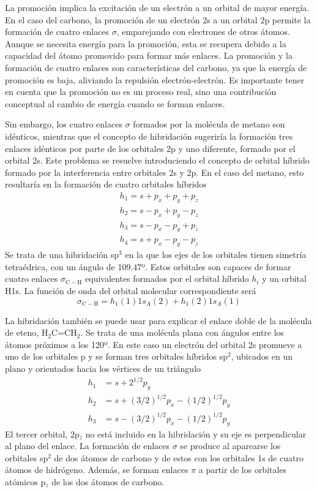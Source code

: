 \documentclass{tufte-handout}
\begin{document}
La promoción implica la excitación de
un electrón a un orbital de mayor energía. En el caso del carbono, 
la promoción de un electrón 2s a un orbital 
2p permite la formación de cuatro enlaces $\sigma$, emparejando con
electrones de otros átomos. Aunque se necesita energía para la
promoción, esta se recupera debido a la capacidad del átomo 
promovido para formar más enlaces. La promoción y la formación de cuatro enlaces son características del carbono, ya que la energía 
de promoción es baja, aliviando la repulsión electrón-electrón. 
Es importante tener en cuenta que la promoción no es un proceso 
real, sino una contribución conceptual al cambio de energía cuando 
se forman enlaces.

Sin embargo, los cuatro enlaces $\sigma$ formados por la molécula
de metano son idénticos, mientras que el concepto de hibridación
sugeriría la formación tres enlaces idénticos por parte de los 
orbitales 2p y uno diferente, formado por el orbital 2s. Este
problema se resuelve introduciendo el concepto de orbital híbrido
formado por la interferencia entre orbitales 2s y 2p.
En el caso del metano, esto resultaría en la formación de cuatro 
orbitales 
híbridos
\begin{align*}
    h_1=s+p_x+p_y+p_z\\
    h_2=s-p_x+p_y-p_z\\
    h_3=s-p_x-p_y+p_z\\
    h_4=s+p_x-p_y-p_z
\end{align*}
Se trata de una hibridación sp$^3$ en la que los ejes 
de los orbitales tienen simetría tetraédrica, con
un ángulo de 109.47º. Estos orbitales son capaces de
formar cuatro enlaces $\sigma_\mathrm{C-H}$ equivalentes
formados por el orbital híbrido $h_i$ y un orbital 
H1s. La función de onda del orbital molecular correspondiente
será 
\begin{equation*}
	\sigma_\mathrm{C-H}=h_1(1)1s_{A}(2)+h_1(2)1s_{A}(1)
\end{equation*}

La hibridación también se puede usar para explicar el enlace
doble de la molécula de eteno, H$_2$C=CH$_2$. Se trata de 
una molécula plana con ángulos entre los átomos próximos
a los 120º. En este caso un electrón del orbital 2s promueve
a uno  de los orbitales p y se forman tres orbitales híbridos
sp$^2$, ubicados en un plano y orientados hacia los vértices
de un triángulo
\begin{align*}
    h_1&=s+2^{1/2}p_y\\
    h_2&=s+(3/2)^{1/2}p_x-(1/2)^{1/2}p_y\\
    h_3&=s-(3/2)^{1/2}p_x-(1/2)^{1/2}p_y
\end{align*}
El tercer orbital, 2p$_z$ no está incluido
en la hibridación y su eje es perpendicular al plano del
enlace.  La formación de enlaces $\sigma$ se produce al aparearse
los orbitales sp$^2$ de dos átomos de carbono y de estos
con los orbitales 1s de cuatro átomos de hidrógeno. Además,
se forman enlaces $\pi$ a partir de los orbitales atómicos
p$_z$ de los dos átomos de carbono.
\end{document}
